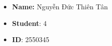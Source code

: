 \begin{itemize}
	\item \textbf{Name:} Nguyễn Đức Thiên Tân
	\item \textbf{Student}: 4
	\item \textbf{ID}: 2550345
\end{itemize}
